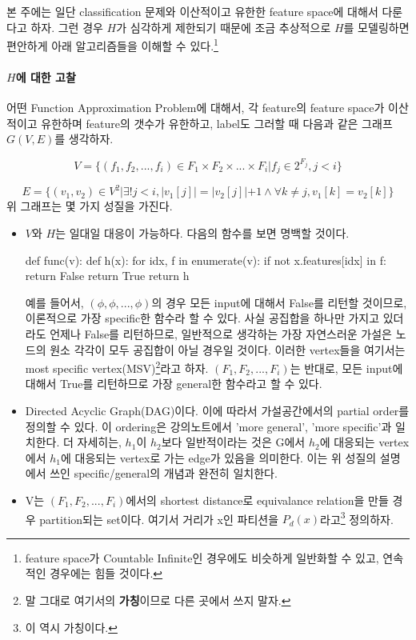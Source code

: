 본 주에는 일단 classification 문제와 이산적이고 유한한 feature space에 대해서 다룬다고 하자. 그런 경우 $H$가 심각하게 제한되기 때문에 조금 추상적으로 $H$를 모델링하면 편안하게 아래 알고리즘들을 이해할 수 있다.\footnote{ feature space가 Countable Infinite인 경우에도 비슷하게 일반화할 수 있고, 연속적인 경우에는 힘들 것이다.} 

\paragraph{$H$에 대한 고찰} 

어떤 Function Approximation Problem에 대해서, 각 feature의 feature space가 이산적이고 유한하며 feature의 갯수가 유한하고, label도 그러할 때 다음과 같은 그래프 $G(V,E)$를 생각하자. 

\begin{equation} 
V = \{(f_1, f_2, ..., f_i) \in F_1 \times F_2 \times ... \times F_i |f_j \in 2^{F_j}, j<i\}
\end{equation} 

\begin{equation} 
E = \{(v_1, v_2) \in V^2| \exists! j<i, |v_1[j]| = |v_2[j]|+1  \wedge \forall k \neq j, v_1[k] = v_2[k] \}
\end{equation} 
위 그래프는 몇 가지 성질을 가진다. 

\begin{itemize} 
\item $V$와 $H$는 일대일 대응이 가능하다. 다음의 함수를 보면 명백할 것이다. 

\begin{Python} 
def func(v):
    def h(x):
        for idx, f in enumerate(v):
            if not x.features[idx] in f:
                return False
        return True
    return h
\end{Python} 

예를 들어서, $(\phi, \phi, ... , \phi)$의 경우 모든 input에 대해서 False를 리턴할 것이므로, 이론적으로 가장 specific한 함수라 할 수 있다. 사실 공집합을 하나만 가지고 있더라도 언제나 False를 리턴하므로, 일반적으로 생각하는 가장 자연스러운 가설은 노드의 원소 각각이 모두 공집합이 아닐 경우일 것이다. 이러한 vertex들을 여기서는 most specific vertex(MSV)\footnote{말 그대로 여기서의 \textbf{가칭}이므로 다른 곳에서 쓰지 말자.}라고 하자.  $(F_1, F_2, ..., F_i)$는 반대로, 모든 input에 대해서 True를 리턴하므로 가장 general한 함수라고 할 수 있다. 

\item Directed Acyclic Graph(DAG)이다. 이에 따라서 가설공간에서의 partial order를 정의할 수 있다. 이 ordering은 강의노트에서 'more general', 'more specific'과 일치한다. 더 자세히는, $h_1$이 $h_2$보다 일반적이라는 것은 G에서 $h_2$에 대응되는 vertex에서 $h_1$에 대응되는 vertex로 가는 edge가 있음을 의미한다. 이는 위 성질의 설명에서 쓰인 specific/general의 개념과 완전히 일치한다. 

\item V는 $(F_1, F_2, ..., F_i)$에서의 shortest distance로 equivalance relation을 만들 경우 partition되는 set이다. 여기서 거리가 x인 파티션을 $P_d(x)$라고\footnote{이 역시 가칭이다.}  정의하자. 
\end{itemize}

